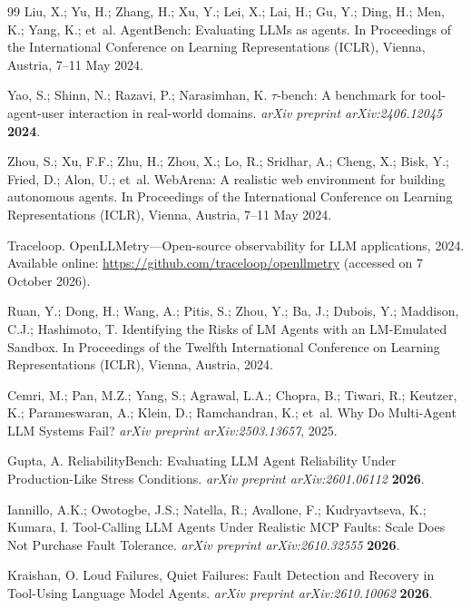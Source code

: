 \documentclass[make,article,submit,moreauthors,pdftex]{mdpi}
\begin{document}
\begin{thebibliography}{99}
Liu, X.; Yu, H.; Zhang, H.; Xu, Y.; Lei, X.; Lai, H.; Gu, Y.; Ding, H.; Men, K.; Yang, K.; et~al.
\newblock AgentBench: Evaluating LLMs as agents.
\newblock In Proceedings of the International Conference on Learning Representations (ICLR), Vienna, Austria, 7--11 May 2024.

Yao, S.; Shinn, N.; Razavi, P.; Narasimhan, K.
\newblock $\tau$-bench: A benchmark for tool-agent-user interaction in real-world domains.
\newblock \textit{arXiv preprint arXiv:2406.12045} \textbf{2024}.

Zhou, S.; Xu, F.F.; Zhu, H.; Zhou, X.; Lo, R.; Sridhar, A.; Cheng, X.; Bisk, Y.; Fried, D.; Alon, U.; et~al.
\newblock WebArena: A realistic web environment for building autonomous agents.
\newblock In Proceedings of the International Conference on Learning Representations (ICLR), Vienna, Austria, 7--11 May 2024.

Traceloop.
\newblock OpenLLMetry---Open-source observability for LLM applications, 2024.
\newblock Available online: \url{https://github.com/traceloop/openllmetry} (accessed on 7 October 2026).

Ruan, Y.; Dong, H.; Wang, A.; Pitis, S.; Zhou, Y.; Ba, J.; Dubois, Y.; Maddison, C.J.; Hashimoto, T.
\newblock Identifying the Risks of LM Agents with an LM-Emulated Sandbox.
\newblock In Proceedings of the Twelfth International Conference on Learning Representations (ICLR), Vienna, Austria, 2024.

Cemri, M.; Pan, M.Z.; Yang, S.; Agrawal, L.A.; Chopra, B.; Tiwari, R.; Keutzer, K.; Parameswaran, A.; Klein, D.; Ramchandran, K.; et~al.
\newblock Why Do Multi-Agent LLM Systems Fail?
\newblock \textit{arXiv preprint arXiv:2503.13657}, 2025.

Gupta, A.
\newblock ReliabilityBench: Evaluating LLM Agent Reliability Under Production-Like Stress Conditions.
\newblock \textit{arXiv preprint arXiv:2601.06112} \textbf{2026}.

Iannillo, A.K.; Owotogbe, J.S.; Natella, R.; Avallone, F.; Kudryavtseva, K.; Kumara, I.
\newblock Tool-Calling LLM Agents Under Realistic MCP Faults: Scale Does Not Purchase Fault Tolerance.
\newblock \textit{arXiv preprint arXiv:2610.32555} \textbf{2026}.

Kraishan, O.
\newblock Loud Failures, Quiet Failures: Fault Detection and Recovery in Tool-Using Language Model Agents.
\newblock \textit{arXiv preprint arXiv:2610.10062} \textbf{2026}.


\end{thebibliography}
\end{document}
